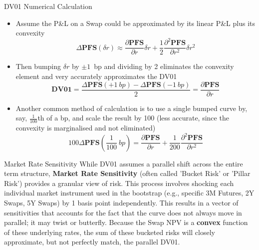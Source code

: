 \documentclass{beamer}
\begin{document}
	\begin{frame}{DV01 Numerical Calculation }
		\begin{itemize}
			\item<1-> Assume the P\&L on a Swap could be approximated by its linear P\&L plus its convexity
			\begin{equation*}
				\Delta \textbf{PFS}(\delta r)\approx \frac{\partial \textbf{PFS} }{\partial r}\delta r + \frac{1}{2}\frac{\partial^2 \textbf{PFS}}{\partial r^2}\delta r^2
			\end{equation*}
			\item<2-> Then bumping $\delta r$ by $\pm 1$~bp and dividing by 2 eliminates the convexity element and very accurately approximates the DV01
			\begin{equation*}
				\textbf{DV01} = \frac{\Delta \textbf{PFS}(+1~bp)-\Delta \textbf{PFS}(-1~bp)}{2}=\frac{\partial \textbf{PFS} }{\partial r}
			\end{equation*}
			\item<3-> Another common method of calculation is to use a single bumped curve by, say, $\frac{1}{100}$th of a bp, and scale the result by 100 (less accurate, since the convexity is marginalised and not eliminated)
			\begin{equation*}
				100\Delta \textbf{PFS}\left(\frac{1}{100}~bp\right)=\frac{\partial \textbf{PFS}}{\partial r}+\frac{1}{200}\frac{\partial^2\textbf{PFS}}{\partial r^2}
			\end{equation*}
		\end{itemize}
	\end{frame}

	\begin{frame}{Market Rate Sensitivity}
		While DV01 assumes a parallel shift across the entire term structure, \textbf{Market Rate Sensitivity} (often called 'Bucket Risk' or 'Pillar Risk') provides a granular view of risk.
		This process involves shocking each individual market instrument used in the bootstrap (e.g., specific 3M Futures, 2Y Swaps, 5Y Swaps) by 1 basis point independently.
		This results in a vector of sensitivities that accounts for the fact that the curve does not always move in parallel; it may twist or butterfly.
		Because the Swap NPV is a \textbf{convex} function of these underlying rates, the sum of these bucketed risks will closely approximate, but not perfectly match, the parallel DV01.
	\end{frame}
\end{document}
